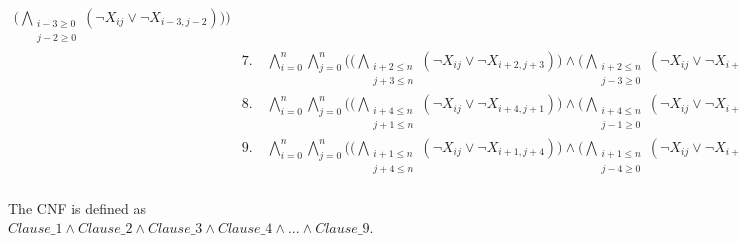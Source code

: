 \documentclass[11pt,a4paper]{report}
\begin{document}
\begin{answers}[10cm]
{\begin{align*}
\Bigg( \bigwedge\limits_{\substack{i-3 \geq 0 \\ j-2 \geq 0}} (\neg X_{ij} \lor \neg X_{i-3,j-2}) \Bigg) \Bigg) \\
&7. \quad \bigwedge\limits_{i=0}^{n} \bigwedge\limits_{j=0}^{n} \Bigg(
\Bigg( \bigwedge\limits_{\substack{i+2 \leq n \\ j+3 \leq n}} (\neg X_{ij} \lor \neg X_{i+2,j+3}) \Bigg) \land
\Bigg( \bigwedge\limits_{\substack{i+2 \leq n \\ j-3 \geq 0}} (\neg X_{ij} \lor \neg X_{i+2,j-3}) \Bigg) \land
\Bigg( \bigwedge\limits_{\substack{i-2 \geq 0 \\ j+3 \leq n}} (\neg X_{ij} \lor \neg X_{i-2,j+3}) \Bigg) \land
\Bigg( \bigwedge\limits_{\substack{i-2 \geq 0 \\ j-3 \geq 0}} (\neg X_{ij} \lor \neg X_{i-2,j-3}) \Bigg) \Bigg) \\
&8. \quad \bigwedge\limits_{i=0}^{n} \bigwedge\limits_{j=0}^{n} \Bigg(
\Bigg( \bigwedge\limits_{\substack{i+4 \leq n \\ j+1 \leq n}} (\neg X_{ij} \lor \neg X_{i+4,j+1}) \Bigg) \land
\Bigg( \bigwedge\limits_{\substack{i+4 \leq n \\ j-1 \geq 0}} (\neg X_{ij} \lor \neg X_{i+4,j-1}) \Bigg) \land
\Bigg( \bigwedge\limits_{\substack{i-4 \geq 0 \\ j+1 \leq n}} (\neg X_{ij} \lor \neg X_{i-4,j+1}) \Bigg) \land
\Bigg( \bigwedge\limits_{\substack{i-4 \geq 0 \\ j-1 \geq 0}} (\neg X_{ij} \lor \neg X_{i-4,j-1}) \Bigg) \Bigg) \\
&9. \quad \bigwedge\limits_{i=0}^{n} \bigwedge\limits_{j=0}^{n} \Bigg(
\Bigg( \bigwedge\limits_{\substack{i+1 \leq n \\ j+4 \leq n}} (\neg X_{ij} \lor \neg X_{i+1,j+4}) \Bigg) \land
\Bigg( \bigwedge\limits_{\substack{i+1 \leq n \\ j-4 \geq 0}} (\neg X_{ij} \lor \neg X_{i+1,j-4}) \Bigg) \land
\Bigg( \bigwedge\limits_{\substack{i-1 \geq 0 \\ j+4 \leq n}} (\neg X_{ij} \lor \neg X_{i-1,j+4}) \Bigg) \land
\Bigg( \bigwedge\limits_{\substack{i-1 \geq 0 \\ j-4 \geq 0}} (\neg X_{ij} \lor \neg X_{i-1,j-4}) \Bigg) \Bigg) \\
\end{align*}

\vspace{-0.2cm}
The CNF is defined as $Clause\_1 \land Clause\_2 \land Clause\_3 \land Clause\_4 \land ... \land Clause\_9$.
}

\end{answers}
\end{document}
